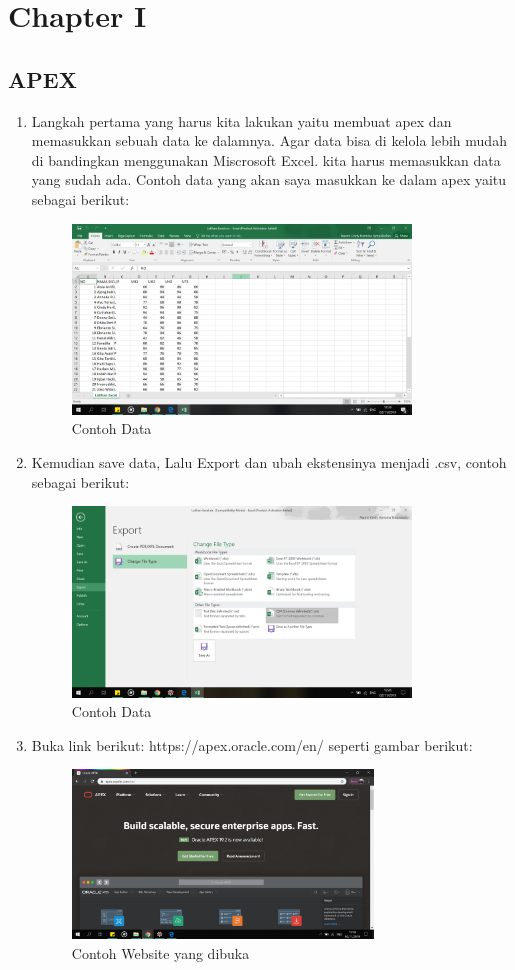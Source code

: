 \chapter{Chapter I}
\section{APEX}

\begin{enumerate}
\item Langkah pertama yang harus kita lakukan yaitu membuat apex dan memasukkan sebuah data ke dalamnya. Agar data bisa di kelola lebih mudah di bandingkan menggunakan Miscrosoft Excel. kita harus memasukkan data yang sudah ada. Contoh data yang akan saya masukkan ke dalam apex yaitu sebagai berikut:
    \begin{figure}[!htbp]
    \centering
    \includegraphics[width=9cm]{picture/01.png}
    \caption{Contoh Data}
    \end{figure}
    
\item Kemudian save data, Lalu Export dan ubah ekstensinya menjadi .csv, contoh sebagai berikut:
    \begin{figure}[!htbp]
    \centering
    \includegraphics[width=9cm]{picture/02.png}
    \caption{Contoh Data}
    \end{figure}
    
\newpage
\item Buka link berikut: https://apex.oracle.com/en/ seperti gambar berikut:
    \begin{figure}[!htbp]
    \centering
    \includegraphics[width=8cm]{picture/03.png}
    \caption{Contoh Website yang dibuka}
    \end{figure}
    

\end{enumerate}

